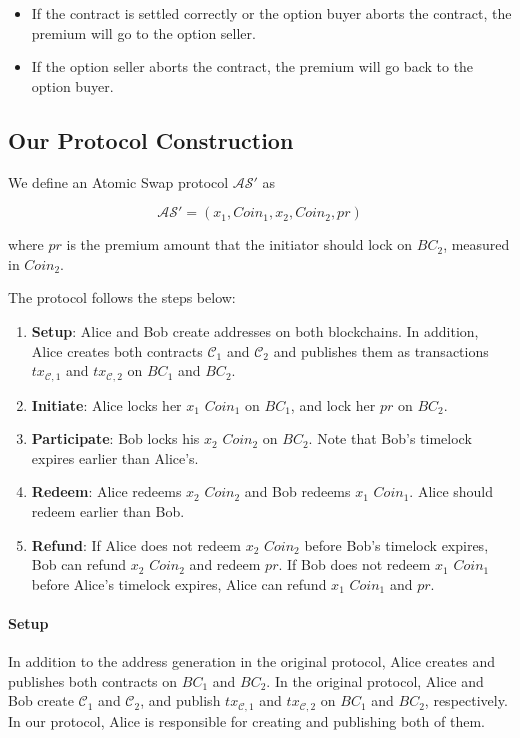 \begin{itemize}
    \item If the contract is settled correctly or the option buyer aborts the contract, the premium will go to the option seller.
    \item If the option seller aborts the contract, the premium will go back to the option buyer.
\end{itemize}


\subsection{Our Protocol Construction}

We define an Atomic Swap protocol $\mathcal{AS}'$ as

$$\mathcal{AS}' = (x_1, Coin_1, x_2, Coin_2, pr)$$

where $pr$ is the premium amount that the initiator should lock on $BC_2$, measured in $Coin_2$.

The protocol follows the steps below:

\begin{enumerate}
    \item \textbf{Setup}: Alice and Bob create addresses on both blockchains.
    In addition, Alice creates both contracts $\mathcal{C}_1$ and $\mathcal{C}_2$ and publishes them as transactions $tx_{\mathcal{C}, 1}$ and $tx_{\mathcal{C}, 2}$ on $BC_1$ and $BC_2$. 
    \item \textbf{Initiate}: Alice locks her $x_1$ $Coin_1$ on $BC_1$, and lock her $pr$ on $BC_2$.
    \item \textbf{Participate}: Bob locks his $x_2$ $Coin_2$ on $BC_2$. Note that Bob's timelock expires earlier than Alice's.
    \item \textbf{Redeem}: Alice redeems $x_2$ $Coin_2$ and Bob redeems $x_1$ $Coin_1$. Alice should redeem earlier than Bob.
    \item \textbf{Refund}: If Alice does not redeem $x_2$ $Coin_2$ before Bob's timelock expires, Bob can refund $x_2$ $Coin_2$ and redeem $pr$.
    If Bob does not redeem $x_1$ $Coin_1$ before Alice's timelock expires, Alice can refund $x_1$ $Coin_1$ and $pr$.
\end{enumerate}

\paragraph{Setup}
In addition to the address generation in the original protocol,
Alice creates and publishes both contracts on $BC_1$ and $BC_2$.
In the original protocol, Alice and Bob create $\mathcal{C}_1$ and $\mathcal{C}_2$, and publish $tx_{\mathcal{C}, 1}$ and $tx_{\mathcal{C}, 2}$ on $BC_1$ and $BC_2$, respectively.
In our protocol, Alice is responsible for creating and publishing both of them.

